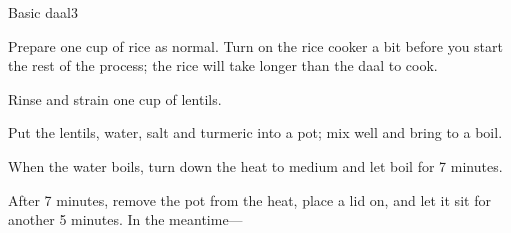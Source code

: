 \documentclass{article}
\begin{document}
  \begin{recipe}{Basic daal}{3}
    \begin{step}
      \begin{ingrs}
      \end{ingrs}
      \begin{stepdesc}
        Prepare one cup of rice as normal. Turn on the rice cooker a bit before you start the rest of the process; the rice will take longer than the daal to cook.
      \end{stepdesc}
    \end{step}
    \begin{step}
      \begin{ingrs}
      \end{ingrs}
      \begin{stepdesc}
        Rinse and strain one cup of lentils.
      \end{stepdesc}
    \end{step}
    \begin{step}
      \begin{ingrs}
      \end{ingrs}
      \begin{stepdesc}
        Put the lentils, water, salt and turmeric into a pot; mix well and bring to a boil.
      \end{stepdesc}
    \end{step}
    \begin{step}
      \begin{ingrs}
      \end{ingrs}
      \begin{stepdesc}
        When the water boils, turn down the heat to medium and let boil for 7 minutes.
      \end{stepdesc}
    \end{step}
    \begin{step}
      \begin{ingrs}
      \end{ingrs}
      \begin{stepdesc}
        After 7 minutes, remove the pot from the heat, place a lid on, and let it sit for another 5 minutes. In the meantime---
      \end{stepdesc}

\end{step}
\end{recipe}
\end{document}
